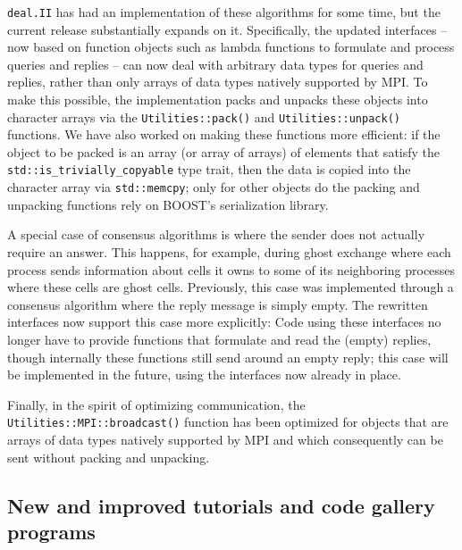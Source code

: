 \documentclass{ansarticle-preprint}
\newcommand{\specialword}[1]{\texttt{#1}}
\newcommand{\dealii}{{\specialword{deal.II}}\xspace}
\begin{document}
\dealii{} has had an implementation of these algorithms for some time,
but the current release substantially expands on it. Specifically, the
updated interfaces -- now based on function objects such as lambda
functions to formulate and process queries and replies -- can now deal
with arbitrary data types for queries and replies, rather than only
arrays of data types natively supported by MPI. To make this possible,
the implementation packs and unpacks these objects into character
arrays via the \texttt{Utilities::pack()} and
\texttt{Utilities::unpack()} functions. We have also worked on making
these functions more efficient: if the object to be packed is an array
(or array of arrays) of elements that satisfy the
\texttt{std::is\_trivially\_copyable} type trait, then the data is
copied into the character array via \texttt{std::memcpy}; only for
other objects do the packing and unpacking functions rely on BOOST's
serialization library.

A special case of consensus algorithms is where the sender does not
actually require an answer. This happens, for example, during ghost
exchange where each process sends information about cells it owns to
some of its neighboring processes where these cells are ghost
cells. Previously, this case was implemented through a consensus
algorithm where the reply message is simply empty.
The rewritten interfaces now support this case more explicitly: Code using
these interfaces no longer have to provide functions that formulate
and read the (empty) replies, though internally these functions still
send around an empty reply; this case will be implemented in the
future, using the interfaces now already in place.

Finally, in the spirit of optimizing communication, the
\texttt{Utilities::MPI::broadcast()} function has been optimized for
objects that are arrays of data types natively supported by MPI and
which consequently can be sent without packing and unpacking.





\subsection{New and improved tutorials and code gallery programs}
\label{subsec:steps}
\end{document}
